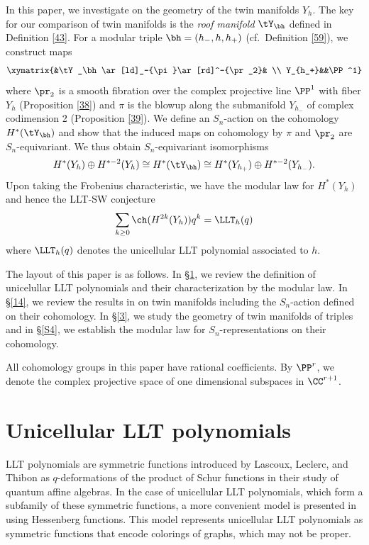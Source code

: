 In this paper, we investigate on the geometry of the twin manifolds $Y_h$. 
The key for our comparison of twin manifolds is the \emph{roof manifold} $\tY_\bh$ defined in Definition \ref{43}. For a modular triple $\bh=(h_-,h,h_+)$ (cf.~Definition \ref{59}), we construct maps
$$\xymatrix{&\tY_\bh \ar[ld]_-{\pi}\ar[rd]^-{\pr_2}& \\ Y_{h_+}&&\PP^1}$$
where $\pr_2$ is a smooth fibration over the complex projective line $\PP^1$ with fiber $Y_h$ (Proposition \ref{38}) and $\pi$ is the blowup along the submanifold $Y_{h_-}$ of complex codimension 2 (Proposition \ref{39}). 
We define an $S_n$-action on the cohomology $H^*(\tY_\bh)$ and show that 
the induced maps on cohomology by $\pi$ and $\pr_2$ are $S_n$-equivariant. 
We thus obtain  $S_n$-equivariant isomorphisms
\[H^*(Y_h)\oplus H^{*-2}(Y_h)\cong H^*(\tY_\bh)\cong 
H^*(Y_{h_+})\oplus H^{*-2}(Y_{h_-}).\]
Upon taking the Frobenius characteristic, we have the modular law for $H^*(Y_h)$ and hence the LLT-SW conjecture
$$\sum_{k\ge 0}\ch (H^{2k}(Y_h)) q^k = \LLT_h(q)$$ 
where $\LLT_h(q)$ denotes the unicellular LLT polynomial associated to $h$.


The layout of this paper is as follows. 
In \S\ref{4}, we review the definition of unicelullar LLT polynomials and their characterization by the modular law.
In \S\ref{14}, we review the results in \cite{AB} on twin manifolds including the $S_n$-action defined on their cohomology. 
In \S\ref{3}, we study the geometry of twin manifolds of triples and in \S\ref{S4}, we establish the modular law for $S_n$-representations on their cohomology. 

All cohomology groups in this paper have rational coefficients. By $\PP^r$, we denote the complex projective space of one dimensional subspaces in $\CC^{r+1}$.

\section{Unicellular LLT polynomials}\label{4}

LLT polynomials are symmetric functions introduced by Lascoux, Leclerc, and Thibon \cite{LLT} as $q$-deformations of the product of Schur functions in their study of quantum affine algebras.  In the case of unicellular LLT polynomials, which form a subfamily of these symmetric functions, a more convenient model is presented in \cite{CM} using Hessenberg functions. This model represents unicellular LLT polynomials as symmetric functions that encode colorings of graphs, which may not be proper.

